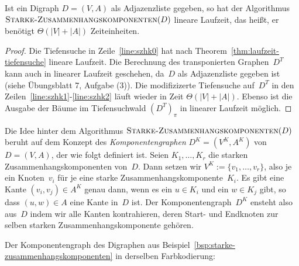 \begin{thm}
\label{thm:starke-zshgk-laufzeit}
Ist ein Digraph $D=(V,A)$ als Adjazenzliste gegeben, so hat der Algorithmus $\mathop{\text{\textsc{Starke-Zusammenhangskomponenten}}}(D)$ lineare Laufzeit, das heißt, er benötigt $\Theta(|V|+|A|)$ Zeiteinheiten.
\end{thm}

\begin{proof}
Die Tiefensuche in Zeile~\ref{line:szhk0} hat nach Theorem~\ref{thm:laufzeit-tiefensuche} lineare Laufzeit.
Die Berechnung des transponierten Graphen~$D^T$ kann auch in linearer Laufzeit geschehen, da~$D$ als Adjazenzliste gegeben ist (siehe Übungsblatt 7, Aufgabe (3)).
Die modifizizerte Tiefensuche auf~$D^T$ in den Zeilen~\ref{line:szhk1}-\ref{line:szhk2} läuft wieder in Zeit $\Theta(|V|+|A|)$.
Ebenso ist die Ausgabe der Bäume im Tiefensuchwald $(D^T)_\pi$ in linearer Laufzeit möglich.
\end{proof}

\begin{bem}
Die Idee hinter dem Algorithmus $\mathop{\text{\textsc{Starke-Zusammenhangskomponenten}}}(D)$ beruht auf dem Konzept des \emph{Komponentengraphen} $D^K=(V^K,A^K)$ von $D=(V,A)$, der wie folgt definiert ist.
Seien $K_1,\ldots,K_r$ die starken Zusammenhangskomponenten von~$D$.
Dann setzen wir $V^K:=\{v_1,\ldots,v_r\}$, also je ein Knoten~$v_i$ für je eine starke Zusammenhangskomponente~$K_i$.
Es gibt eine Kante $(v_i,v_j) \in A^K$ genau dann, wenn es ein $u \in K_i$ und ein $w \in K_j$ gibt, so dass $(u,w) \in A$ eine Kante in~$D$ ist.
Der Komponentengraph~$D^K$ ensteht also aus~$D$ indem wir alle Kanten kontrahieren, deren Start- und Endknoten zur selben starken Zusammenhangskomponente gehören.
\end{bem}

\begin{bsp}
\label{bsp:komponentengraph}
Der Komponentengraph des Digraphen aus Beispiel~\ref{bsp:starke-zusammenhangskomponenten} in derselben Farbkodierung:

\hfill
{}
\hfill\,
\end{bsp}

